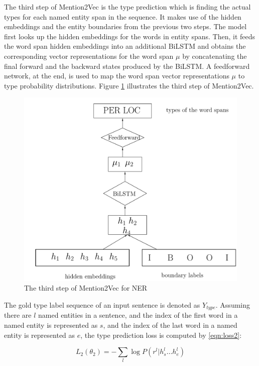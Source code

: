 The third step of Mention2Vec is the type prediction which is finding the actual types for each named entity span in the sequence. It makes use of the hidden embeddings and the entity boundaries from the previous two steps. The model first looks up the hidden embeddings for the words in entity spans. Then, it feeds the word span hidden embeddings into an additional BiLSTM and obtains the corresponding vector representations for the word span $\mu$ by concatenating the final forward and the backward states produced by the BiLSTM. A feedforward network, at the end, is used to map the word span vector representations $\mu$ to type probability distributions. Figure \ref{fig:mention2vec3} illustrates the third step of Mention2Vec.

\begin{figure}
  \centering
  \includegraphics[scale=0.6]{mention2vec3.pdf}
 \caption{The third step of Mention2Vec for NER}
  \label{fig:mention2vec3}
\end{figure}

The gold type label sequence of an input sentence is denoted as $Y_{type}$. Assuming there are $l$ named entities in a sentence, and the index of the first word in a named entity is represented as $s$, and the index of the last word in a named entity is represented as $e$, the type prediction loss is computed by \ref{eqn:loss2}:

\begin{equation}\label{eqn:loss2}
  L_{2}\left(\theta _{2}\right) =-\sum _{l}\log P\left( r^{l}|h_{s}^{l}{\ldots }h_{e}^{l}\right)
\end{equation}

